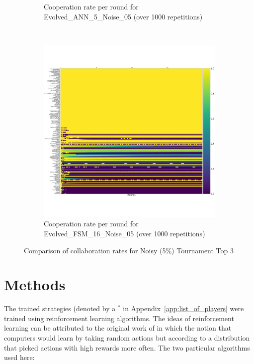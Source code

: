 \documentclass{article}
\begin{document}
\begin{figure}[!hbtp]
\begin{subfigure}[t]{.3\textwidth}
        \caption{Cooperation rate per round for Evolved\_ANN\_5\_Noise\_05 (over 1000
        repetitions)}
    \end{subfigure}%
    ~
    \begin{subfigure}[t]{.3\textwidth}
        \centering
        \includegraphics[width=\textwidth]{./assets/cooperation_0_0_1000_Evolved_FSM_16_Noise_05_array.pdf}
        \caption{Cooperation rate per round for Evolved\_FSM\_16\_Noise\_05 (over 1000
        repetitions)}
    \end{subfigure}%

    \caption{Comparison of collaboration rates for Noisy (5\%) Tournament Top 3}
    \label{fig:comparison_cooperation_heatmaps_noisy}
\end{figure}


\section{Methods}\label{sec:methods}

The trained strategies (denoted by a \(^{*}\) in
Appendix~\ref{app:list_of_players} were trained using reinforcement
learning algorithms. The ideas of reinforcement learning can be attributed to
the original work of \cite{turing1950computing} in which the notion that
computers would learn by taking random actions but according to a distribution
that picked actions with high rewards more often. The two particular algorithms
used here:
\end{document}
